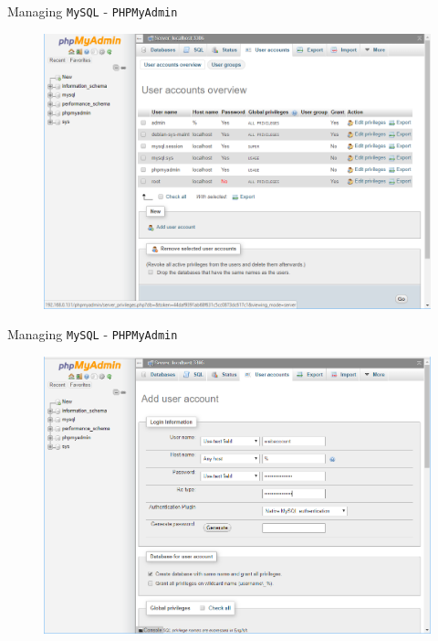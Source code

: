 \documentclass[xcolor=table]{beamer}
\begin{document}
\begin{frame}{Managing \texttt{MySQL} - \texttt{PHPMyAdmin}}
  \begin{figure}
    \begin{center}
      \includegraphics[width=0.9\linewidth]{Accounts.png}
    \end{center}
  \end{figure}
\end{frame}

\begin{frame}{Managing \texttt{MySQL} - \texttt{PHPMyAdmin}}
  \begin{figure}
    \begin{center}
      \includegraphics[width=0.9\linewidth]{Accounts2.png}
    \end{center}
  \end{figure}
\end{frame}
\end{document}
